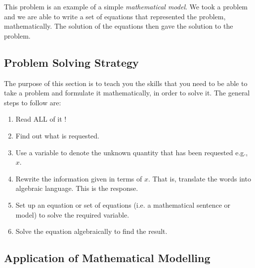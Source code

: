 \documentclass[10pt,a4paper,titlepage,twoside,openright]{report}
\begin{document}
This problem is an example of a simple \textit{mathematical model}. We took a problem and we are able to write a set of equations that represented the problem, mathematically. The solution of the equations then gave the solution to the problem.



\subsection{Problem Solving Strategy}
\label{ms:pss}
The purpose of this section is to teach you the skills that you need to be able to take a problem and formulate it mathematically, in order to solve it. The general steps to follow are:

\begin{enumerate}
\item Read ALL of it !
\item Find out what is requested.
\item Use a variable to denote the unknown quantity that has been requested e.g., $x$.
\item Rewrite the information given in terms of $x$.  That is, translate the words into algebraic language.  This is the response.
\item Set up an equation or set of equations (i.e. a mathematical sentence or model) to solve the required variable.
\item Solve the equation algebraically to find the result.
\end{enumerate}


\subsection{Application of Mathematical Modelling}
\end{document}
